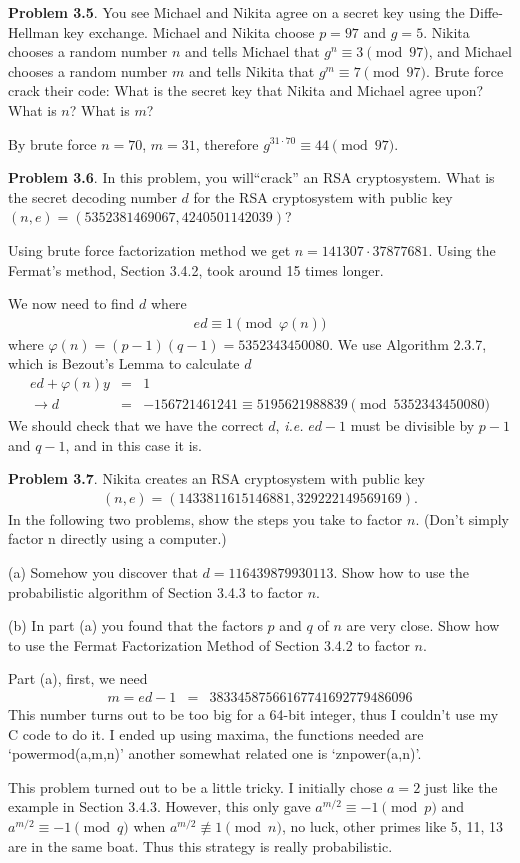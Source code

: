 \documentclass[aps,preprint,preprintnumbers,nofootinbib,showpacs,prd]{revtex4-1}
\newcommand{\ie}{{\it i.e.} }
\newcommand{\nbea}{\begin{eqnarray*}}
\newcommand{\neea}{\end{eqnarray*}}
\begin{document}
{\bf Problem 3.5}. You see Michael and Nikita agree on a secret key using the Diffe-Hellman key exchange. Michael and Nikita choose $p = 97$ and $g = 5$. Nikita chooses a random number $n$ and tells Michael that $g^n \equiv 3 \pmod{97}$, and Michael chooses a random number $m$ and tells Nikita that $g^m \equiv 7 \pmod{97}$. Brute force crack their code: What is the secret key that Nikita and Michael agree upon? What is $n$? What is $m$?

By brute force $n = 70$, $m = 31$, therefore $g^{31 \cdot 70} \equiv 44 \pmod{97}$.

{\bf Problem 3.6}. In this problem, you will``crack'' an RSA cryptosystem. What is the secret decoding number $d$ for the RSA cryptosystem with public key $(n, e) = (5352381469067, 4240501142039)$?

Using brute force factorization method we get $n = 141307 \cdot 37877681$. Using the Fermat's method, Section 3.4.2, took around 15 times longer.

We now need to find $d$ where
%
\nbea
ed \equiv 1 \pmod{\varphi(n)}
\neea
%
where $\varphi(n) = (p-1)(q-1) = 5352343450080$. We use Algorithm 2.3.7, which is Bezout's Lemma to calculate $d$
%
\nbea
ed + \varphi(n) y & = & 1 \\
\to d & = & -156721461241 \equiv 5195621988839 \pmod{5352343450080}
\neea
%
We should check that we have the correct $d$, \ie $ed-1$ must be divisible by $p-1$ and $q-1$, and in this case it is.

{\bf Problem 3.7}. Nikita creates an RSA cryptosystem with public key
%
\nbea
(n, e) = (1433811615146881, 329222149569169).
\neea
%
In the following two problems, show the steps you take to factor $n$. (Don't simply factor n directly using a computer.)

(a) Somehow you discover that $d = 116439879930113$. Show how to use the probabilistic algorithm of Section 3.4.3 to factor $n$.

(b) In part (a) you found that the factors $p$ and $q$ of $n$ are very close. Show how to use the Fermat Factorization Method of Section 3.4.2 to factor $n$.

Part (a), first, we need
%
\nbea
m = ed - 1 & = & 38334587566167741692779486096
\neea
%
This number turns out to be too big for a 64-bit integer, thus I couldn't use my C code to do it. I ended up using maxima, the functions needed are `power\textunderscore mod(a,m,n)' another somewhat related one is `zn\textunderscore power(a,n)'.

This problem turned out to be a little tricky. I initially chose $a=2$ just like the example in Section 3.4.3. However, this only gave $a^{m/2} \equiv -1 \pmod{p}$ and $a^{m/2} \equiv -1 \pmod{q}$ when $a^{m/2} \not\equiv 1 \pmod{n}$, no luck, other primes like 5, 11, 13 are in the same boat. Thus this strategy is really probabilistic.
\end{document}
